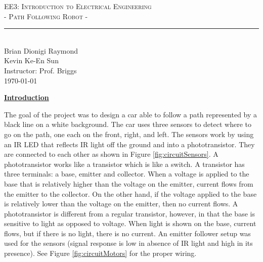 \documentclass[twocolumn]{article}
\newcommand{\classname}{EE3: Introduction to Electrical Engineering}
\newcommand{\project}{- Path Following Robot -}
\newcommand{\authorname}{Brian Dionigi Raymond\\Kevin Ke-En Sun}
\newcommand{\instructor}{Prof. Briggs}
\newcommand{\sectionTitle}[1]{ {\large\textbf{\uline{#1}}} \\ \vspace{1.5em} }
\newcommand{\textIntroOne}{The goal of the project was to design a car able to follow a path represented by a black line on a white background. The car uses three sensors to detect where to go on the path, one each on the front, right, and left. The sensors work by using an IR LED that reflects IR light off the ground and into a phototransistor. They are connected to each other as shown in Figure \ref{fig:circuitSensors}. A phototransistor works like a transistor which is like a switch. A transistor has three terminals: a base, emitter and collector. When a voltage is applied to the base that is relatively higher than the voltage on the emitter, current flows from the emitter to the collector. On the other hand, if the voltage applied to the base is relatively lower than the voltage on the emitter, then no current flows. A phototransistor is different from a regular transistor, however, in that the base is sensitive to light as opposed to voltage. When light is shown on the base, current flows, but if there is no light, there is no current. An emitter follower setup was used for the sensors (signal response is low in absence of IR light and high in its presence). See Figure \ref{fig:circuitMotors} for the proper wiring.}
\begin{document}
		
	\begin{center}
		{\LARGE \textsc{\classname \\ \project} \\ \vspace{4pt}}
		\rule[13pt]{0.5\textwidth}{1pt} \\ %
		{\authorname \\ \vspace{2pt}
			Instructor: \instructor \\ \vspace{2pt}
			\today \\ \vspace{2pt}
		}
	\end{center}	
	
	\begin{flushleft}
		\sectionTitle{Introduction}
		
		\textIntroOne \\ \vspace{1em}
		
		\begin{figure}[!h]


\end{figure}
\end{flushleft}
\end{document}
